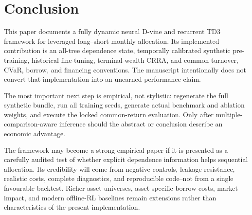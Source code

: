 \section{Conclusion}
\label{sec:conclusion}

This paper documents a fully dynamic neural D-vine and recurrent TD3 framework for leveraged long--short monthly allocation. Its implemented contribution is an all-tree dependence state, temporally calibrated synthetic pre-training, historical fine-tuning, terminal-wealth CRRA, and common turnover, CVaR, borrow, and financing conventions. The manuscript intentionally does not convert that implementation into an unearned performance claim.

The most important next step is empirical, not stylistic: regenerate the full synthetic bundle, run all training seeds, generate actual benchmark and ablation weights, and execute the locked common-return evaluation. Only after multiple-comparison-aware inference should the abstract or conclusion describe an economic advantage.

The framework may become a strong empirical paper if it is presented as a carefully audited test of whether explicit dependence information helps sequential allocation. Its credibility will come from negative controls, leakage resistance, realistic costs, complete diagnostics, and reproducible code--not from a single favourable backtest. Richer asset universes, asset-specific borrow costs, market impact, and modern offline-RL baselines remain extensions rather than characteristics of the present implementation.

